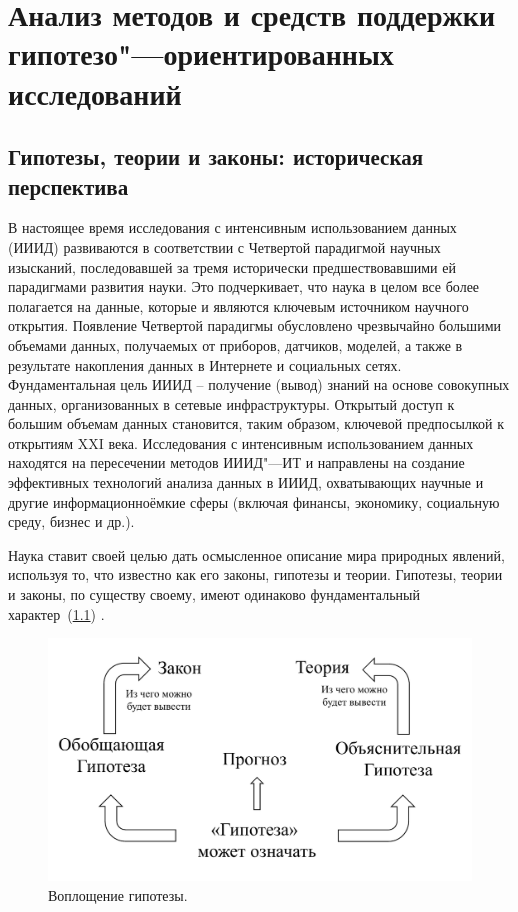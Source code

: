 \chapter{Анализ методов и средств поддержки гипотезо"---ориентированных исследований} \label{chapt1}

\section{Гипотезы, теории и законы: историческая перспектива} \label{sect1_1}

В настоящее время исследования с интенсивным использованием данных (ИИИД) развиваются в соответствии с Четвертой 
парадигмой \cite{Hey2009} научных изысканий, последовавшей за тремя исторически предшествовавшими ей парадигмами 
развития науки. Это подчеркивает, что наука в целом все более полагается на данные, которые и являются ключевым 
источником научного открытия. Появление Четвертой парадигмы обусловлено чрезвычайно большими объемами данных, 
получаемых от приборов, датчиков, моделей, а также в результате накопления данных в Интернете и социальных сетях. 
Фундаментальная цель ИИИД – получение (вывод) знаний на основе совокупных данных, организованных в сетевые 
инфраструктуры. Открытый доступ к большим объемам данных становится, таким образом, ключевой предпосылкой к открытиям 
XXI века. Исследования с интенсивным использованием данных находятся на пересечении методов ИИИД"---ИТ и направлены 
на создание эффективных технологий анализа данных в ИИИД, охватывающих научные и другие информационноёмкие сферы 
(включая финансы, экономику, социальную среду, бизнес и др.).

Наука ставит своей целью дать осмысленное описание мира природных явлений, используя то, что известно как его законы, 
гипотезы и теории. Гипотезы, теории и законы, по существу своему, имеют одинаково фундаментальный 
характер~(\cref{fig:hypothesis_repr}) \cite{McComas2005}. 

\begin{figure}[ht]
    \centering
    \includegraphics[width=0.7\linewidth]{images/hypothesis_life.pdf}
    \caption{Воплощение гипотезы.}\label{fig:hypothesis_repr}
\end{figure}

